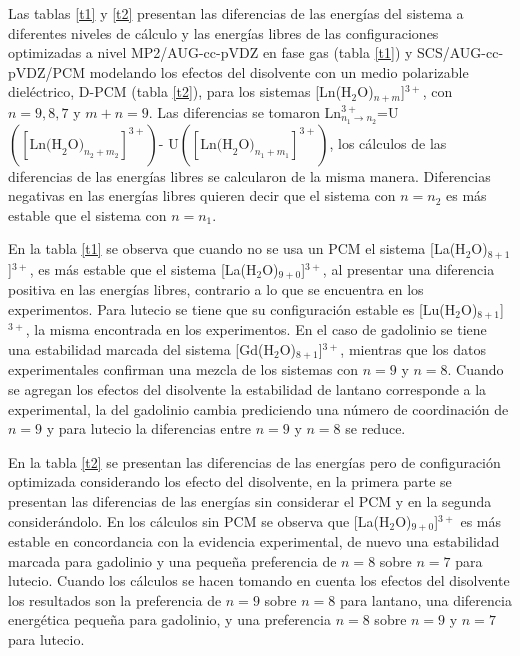 Las tablas \ref{t1} y \ref{t2} presentan las diferencias de las 
energ\'ias del sistema a diferentes niveles de c\'alculo y las 
energ\'ias libres de las configuraciones optimizadas a nivel 
MP2/AUG-cc-pVDZ en fase gas (tabla \ref{t1}) y SCS/AUG-cc-pVDZ/PCM 
modelando los efectos del disolvente con un medio polarizable 
diel\'ectrico, D-PCM (tabla \ref{t2}), para los sistemas 
[Ln(H$_2$O)$_{n+m}$]$^{3+}$, con $n=9,8,7$ y $m+n=9$. Las diferencias
se tomaron
Ln$^{3+}_{n_1\to n_2}$=U$\left([\mbox{Ln(H}_2\mbox{O)}_{n_2+m_2}]^{3+}\right)$-
U$\left([\mbox{Ln(H}_2\mbox{O)}_{n_1+m_1}]^{3+}\right)$, los 
c\'alculos de las diferencias de las energ\'ias libres se calcularon 
de la misma manera. Diferencias negativas en las energ\'ias libres
quieren decir que el sistema con $n=n_2$ es m\'as estable que el 
sistema con $n=n_1$.

En la tabla \ref{t1} se observa que cuando no se usa un PCM el sistema
[La(H$_2$O)$_{8+1}$]$^{3+}$, es m\'as estable que el sistema 
[La(H$_2$O)$_{9+0}$]$^{3+}$, al presentar una diferencia positiva en 
las energ\'ias libres, contrario a lo que se encuentra en los 
experimentos. Para lutecio se tiene que su configuraci\'on estable es
[Lu(H$_2$O)$_{8+1}$]$^{3+}$, la misma encontrada en los experimentos. 
En el caso de gadolinio se tiene una estabilidad marcada del sistema
[Gd(H$_2$O)$_{8+1}$]$^{3+}$, mientras que los datos experimentales 
confirman una mezcla de los sistemas con $n=9$ y $n=8$. Cuando se
agregan los efectos del disolvente la estabilidad de lantano 
corresponde a la experimental, la del gadolinio cambia prediciendo
una n\'umero de coordinaci\'on de $n=9$ y para lutecio la diferencias
entre $n=9$ y $n=8$ se reduce.
\linespread{1.}

\linespread{1.75}

En la tabla \ref{t2} se presentan las diferencias de las energ\'ias 
pero de configuraci\'on optimizada considerando los efecto del 
disolvente, en la primera parte se presentan las diferencias de las 
energ\'ias sin considerar el PCM y en la segunda consider\'andolo. En
los c\'alculos sin PCM se observa que [La(H$_2$O)$_{9+0}$]$^{3+}$ es
m\'as estable en concordancia con la evidencia experimental, de nuevo
una estabilidad marcada para gadolinio y una peque\~na preferencia de
$n=8$ sobre $n=7$ para lutecio. Cuando los c\'alculos se hacen 
tomando en cuenta los efectos del disolvente los resultados son la
preferencia de $n=9$ sobre $n=8$ para lantano, una diferencia 
energ\'etica peque\~na para gadolinio, y una preferencia $n=8$ sobre
$n=9$ y $n=7$ para lutecio.
\linespread{1.}

\linespread{1.75}


